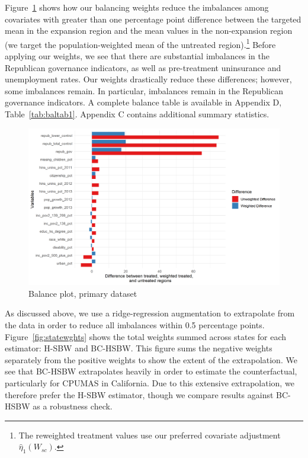 \documentclass[aoas]{imsart}
\theoremstyle{plain}
\theoremstyle{remark}
\begin{document}
Figure~\ref{fig:loveplotc1} shows how our balancing weights reduce the imbalances among covariates with greater than one percentage point difference between the targeted mean in the expansion region and the mean values in the non-expansion region (we target the population-weighted mean of the untreated region).\footnote{The reweighted treatment values use our preferred covariate adjustment $\hat{\eta}_1(W_{sc})$.} Before applying our weights, we see that there are substantial imbalances in the Republican governance indicators, as well as pre-treatment uninsurance and unemployment rates. Our weights drastically reduce these differences; however, some imbalances remain. In particular, imbalances remain in the Republican governance indicators. A complete balance table is available in Appendix D, Table~\ref{tab:baltab1}. Appendix C contains additional summary statistics. 

\begin{figure}[B]
\begin{center}
    \caption{Balance plot, primary dataset}
    \label{fig:loveplotc1}
    \includegraphics[scale=0.6]{01_Plots/balance-plot-etu.png}
\end{center}
\end{figure}

As discussed above, we use a ridge-regression augmentation to extrapolate from the data in order to reduce all imbalances within 0.5 percentage points. Figure~\ref{fig:statewghts} shows the total weights summed across states for each estimator: H-SBW and BC-HSBW. This figure sums the negative weights separately from the positive weights to show the extent of the extrapolation. We see that BC-HSBW extrapolates heavily in order to estimate the counterfactual, particularly for CPUMAS in California. Due to this extensive extrapolation, we therefore prefer the H-SBW estimator, though we compare results against BC-HSBW as a robustness check.
\end{document}
